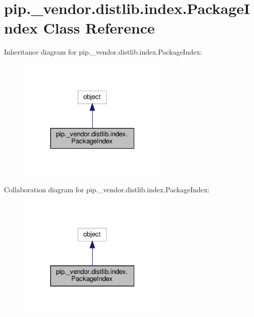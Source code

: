 \hypertarget{classpip_1_1__vendor_1_1distlib_1_1index_1_1PackageIndex}{}\section{pip.\+\_\+vendor.\+distlib.\+index.\+Package\+Index Class Reference}
\label{classpip_1_1__vendor_1_1distlib_1_1index_1_1PackageIndex}


Inheritance diagram for pip.\+\_\+vendor.\+distlib.\+index.\+Package\+Index\+:
\nopagebreak
\begin{figure}[H]
\begin{center}
\leavevmode
\includegraphics[width=205pt]{classpip_1_1__vendor_1_1distlib_1_1index_1_1PackageIndex__inherit__graph}
\end{center}
\end{figure}


Collaboration diagram for pip.\+\_\+vendor.\+distlib.\+index.\+Package\+Index\+:
\nopagebreak
\begin{figure}[H]
\begin{center}
\leavevmode
\includegraphics[width=205pt]{classpip_1_1__vendor_1_1distlib_1_1index_1_1PackageIndex__coll__graph}
\end{center}
\end{figure}

